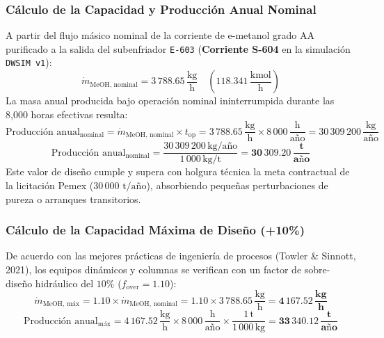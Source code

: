 \documentclass[10pt,letterpaper]{article}
\begin{document}
\subsubsection{Cálculo de la Capacidad y Producción Anual Nominal}
A partir del flujo másico nominal de la corriente de e-metanol grado AA purificado a la salida del subenfriador \texttt{E-603} (\textbf{Corriente S-604} en la simulación \texttt{DWSIM v1}):
\begin{equation}
\dot{m}_{\text{MeOH, nominal}} = 3\,788.65\,\frac{\text{kg}}{\text{h}} \quad \left(118.341\,\frac{\text{kmol}}{\text{h}}\right)
\end{equation}
La masa anual producida bajo operación nominal ininterrumpida durante las 8,000 horas efectivas resulta:
\begin{equation}
\text{Producción anual}_{\text{nominal}} = \dot{m}_{\text{MeOH, nominal}} \times t_{\text{op}} = 3\,788.65\,\frac{\text{kg}}{\text{h}} \times 8\,000\,\frac{\text{h}}{\text{año}} = 30\,309\,200\,\frac{\text{kg}}{\text{año}}
\end{equation}
\begin{equation}
\text{Producción anual}_{\text{nominal}} = \frac{30\,309\,200\,\text{kg/año}}{1\,000\,\text{kg/t}} = \mathbf{30\,309.20\,\frac{\text{t}}{\text{año}}}
\end{equation}
Este valor de diseño cumple y supera con holgura técnica la meta contractual de la licitación Pemex ($30\,000\text{ t/año}$), absorbiendo pequeñas perturbaciones de pureza o arranques transitorios.

\subsubsection{Cálculo de la Capacidad Máxima de Diseño (+10\%)}
De acuerdo con las mejores prácticas de ingeniería de procesos (Towler \& Sinnott, 2021), los equipos dinámicos y columnas se verifican con un factor de sobre-diseño hidráulico del $10\%$ ($f_{\text{over}} = 1.10$):
\begin{equation}
\dot{m}_{\text{MeOH, máx}} = 1.10 \times \dot{m}_{\text{MeOH, nominal}} = 1.10 \times 3\,788.65\,\frac{\text{kg}}{\text{h}} = \mathbf{4\,167.52\,\frac{\text{kg}}{\text{h}}}
\end{equation}
\begin{equation}
\text{Producción anual}_{\text{máx}} = 4\,167.52\,\frac{\text{kg}}{\text{h}} \times 8\,000\,\frac{\text{h}}{\text{año}} \times \frac{1\,\text{t}}{1\,000\,\text{kg}} = \mathbf{33\,340.12\,\frac{\text{t}}{\text{año}}}
\end{equation}
\end{document}
